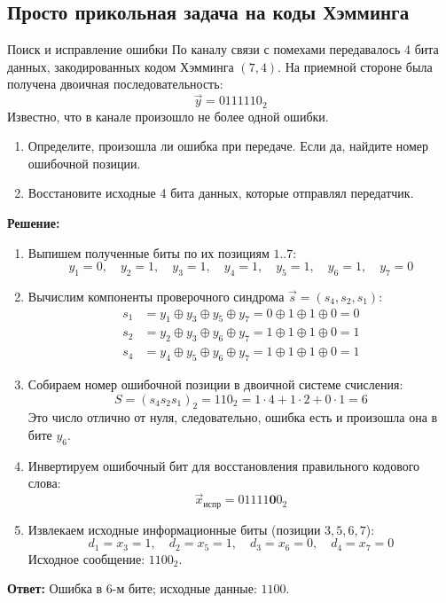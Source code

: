 \documentclass[11pt,a4paper]{article}
\begin{document}
\subsection{Просто прикольная задача на коды Хэмминга}
\begin{taskbox}{Поиск и исправление ошибки}
По каналу связи с помехами передавалось 4 бита данных, закодированных кодом Хэмминга $(7, 4)$. На приемной стороне была получена двоичная последовательность:
$$\vec{y} = 0111110_2$$
Известно, что в канале произошло не более одной ошибки. 
\begin{enumerate}
    \item Определите, произошла ли ошибка при передаче. Если да, найдите номер ошибочной позиции.
    \item Восстановите исходные 4 бита данных, которые отправлял передатчик.
\end{enumerate}
\end{taskbox}

\textbf{Решение:}
\begin{enumerate}
    \item Выпишем полученные биты по их позициям $1..7$:
    $$y_1 = 0, \quad y_2 = 1, \quad y_3 = 1, \quad y_4 = 1, \quad y_5 = 1, \quad y_6 = 1, \quad y_7 = 0$$
    \item Вычислим компоненты проверочного синдрома $\vec{s} = (s_4, s_2, s_1)$:
    \begin{align*}
        s_1 &= y_1 \oplus y_3 \oplus y_5 \oplus y_7 = 0 \oplus 1 \oplus 1 \oplus 0 = 0 \\
        s_2 &= y_2 \oplus y_3 \oplus y_6 \oplus y_7 = 1 \oplus 1 \oplus 1 \oplus 0 = 1 \\
        s_4 &= y_4 \oplus y_5 \oplus y_6 \oplus y_7 = 1 \oplus 1 \oplus 1 \oplus 0 = 1
    \end{align*}
    \item Собираем номер ошибочной позиции в двоичной системе счисления:
    $$S = (s_4 s_2 s_1)_2 = 110_2 = 1 \cdot 4 + 1 \cdot 2 + 0 \cdot 1 = 6$$
    Это число отлично от нуля, следовательно, ошибка есть и произошла она в бите $y_6$.
    \item Инвертируем ошибочный бит для восстановления правильного кодового слова:
    $$\vec{x}_{\text{испр}} = 01111\mathbf{0}0_2$$
    \item Извлекаем исходные информационные биты (позиции $3, 5, 6, 7$):
    $$d_1 = x_3 = 1, \quad d_2 = x_5 = 1, \quad d_3 = x_6 = 0, \quad d_4 = x_7 = 0$$
    Исходное сообщение: $1100_2$.
\end{enumerate}
\textbf{Ответ:} Ошибка в 6-м бите; исходные данные: $1100$.
\end{document}
